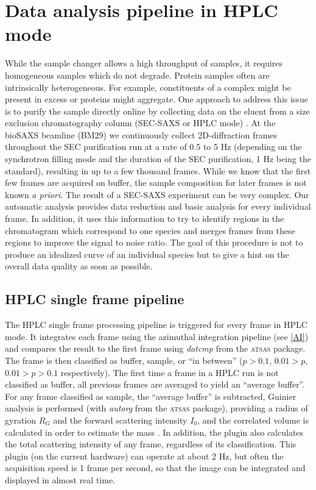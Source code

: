 \documentclass[preprint,pdf]{iucr}              %
\begin{document}
\section{Data analysis pipeline in HPLC mode}
While the sample changer allows a high throughput of samples, it requires
homogeneous samples which do not degrade.
Protein samples often are intrinsically heterogeneous.
For example, constituents of a complex might be present in excess or proteins
might aggregate.
One approach to address this issue is to purify the sample directly online by collecting data
on the eluent from a size exclusion chromatography column (SEC-SAXS or HPLC mode) \cite{SECPaper2012,SECP12,SECSWING}.
At the bioSAXS beamline (BM29) we continuously collect 2D-diffraction frames
throughout the SEC purification run at a rate of 0.5 to 5 Hz
(depending on the synchrotron filling mode and the duration of the SEC purification, 1 Hz being the standard),
resulting in up to a few thousand frames.
While we know that the first few frames are acquired on buffer, the sample composition
for later frames is not known \textit{a priori}.
The result of a SEC-SAXS experiment can be very complex.
Our automatic analysis provides data reduction and basic analysis for every
individual frame.
In addition, it uses this information to try to identify regions in the
chromatogram which correspond to one species and merges frames from these
regions to improve the signal to noise ratio.
The goal of this procedure is not to produce an idealized curve of an individual
species but to give a hint on the overall data quality as soon as possible.

\subsection{HPLC single frame pipeline}

The HPLC single frame processing pipeline is triggered for every frame in HPLC mode.
It integrates each frame using the azimuthal integration pipeline (see
\ref{AI}) and compares the result to the first frame using \textit{datcmp} from the
\textsc{atsas} package.
The frame is then classified as buffer, sample, or ``in between''
($p>0.1$, $0.01 > p$, $0.01>p>0.1$  respectively).
The first time a frame in a HPLC run is not classified as buffer, all previous
frames are averaged to yield an ``average buffer''.
For any frame classified as sample, the ``average buffer'' is subtracted, Guinier
analysis is performed (with \textit{autorg} from the \textsc{atsas} package),
providing a radius of gyration $R_G$ and the forward scattering intensity $I_0$,
and the correlated volume is calculated in order to estimate the mass
\cite{RamboTainerNature2013}.
In addition, the plugin also calculates the total scattering intensity of any
frame, regardless of its classification.
This plugin (on the current hardware) can operate at about 2 Hz, but often the
acquisition speed is 1 frame per second, so that the image can be integrated and
displayed in almost real time.
\end{document}
